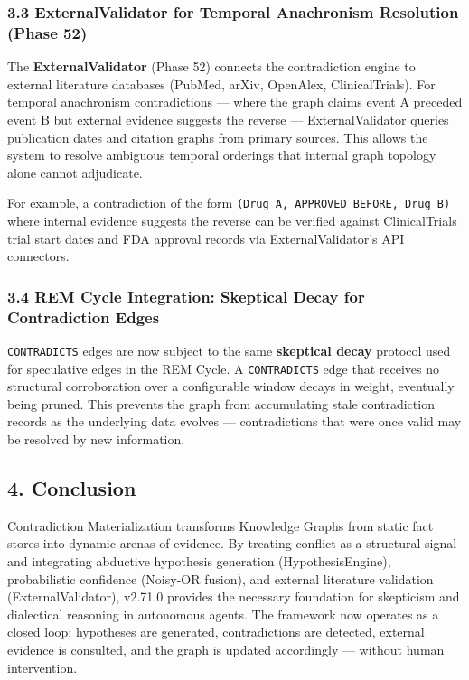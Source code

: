 \subsubsection*{3.3 ExternalValidator for Temporal Anachronism Resolution (Phase 52)}
The \textbf{ExternalValidator} (Phase 52) connects the contradiction engine to external literature databases (PubMed, arXiv, OpenAlex, ClinicalTrials). For temporal anachronism contradictions --- where the graph claims event A preceded event B but external evidence suggests the reverse --- ExternalValidator queries publication dates and citation graphs from primary sources. This allows the system to resolve ambiguous temporal orderings that internal graph topology alone cannot adjudicate.

For example, a contradiction of the form \texttt{(Drug\_A, APPROVED\_BEFORE, Drug\_B)} where internal evidence suggests the reverse can be verified against ClinicalTrials trial start dates and FDA approval records via ExternalValidator's API connectors.

\subsubsection*{3.4 REM Cycle Integration: Skeptical Decay for Contradiction Edges}
\texttt{CONTRADICTS} edges are now subject to the same \textbf{skeptical decay} protocol used for speculative edges in the REM Cycle. A \texttt{CONTRADICTS} edge that receives no structural corroboration over a configurable window decays in weight, eventually being pruned. This prevents the graph from accumulating stale contradiction records as the underlying data evolves --- contradictions that were once valid may be resolved by new information.

\subsection*{4. Conclusion}
Contradiction Materialization transforms Knowledge Graphs from static fact stores into dynamic arenas of evidence. By treating conflict as a structural signal and integrating abductive hypothesis generation (HypothesisEngine), probabilistic confidence (Noisy-OR fusion), and external literature validation (ExternalValidator), v2.71.0 provides the necessary foundation for skepticism and dialectical reasoning in autonomous agents. The framework now operates as a closed loop: hypotheses are generated, contradictions are detected, external evidence is consulted, and the graph is updated accordingly --- without human intervention.